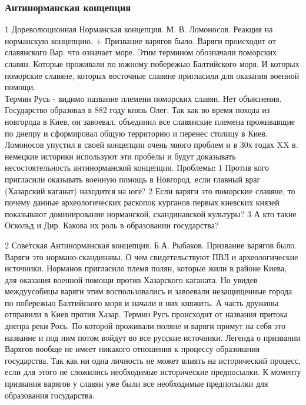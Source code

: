 \documentclass[a4paper]{article}
\begin{document}
\subsubsection{Антинорманская концепция}
1   Дореволюционная Норманская концепция. М. В. Ломоносов.
    Реакция на норманскую концепцию. 
    + Призвание варягов было. Варяги происходит от славянского Вар. что означает море. Этим термином обозначали поморских славян. Которые проживали по южному побережью Балтийского моря. И которых поморские славяне, которых восточные славяне пригласили для оказания военной помощи. \\
    Термин Русь - видимо название племени поморских славян. Нет объяснения. \\
    Государство образовал в 882 году князь Олег. Так как во время похода из новгорода в Киев, он завоевал, объединил все славянские племена проживавщие по днепру и сформировал общую территорию и перенес столицу в Киев.
    Ломоносов упустил в своей концепции очень много проблем и в 30х годах XX в. немецкие историки используют эти пробелы и будут доказывать несостоятельность антинорманской концепции.
    Проблемы: 
        1 Против кого пригласили оказывать военную помощь в Новгород, если главный враг (Хазарский каганат) находится на юге?
        2 Если варяги это поморские славяне, то почему данные археологических раскопок курганов первых киевских князей показывают доминирование норманской, скандинавской культуры?
        3 А кто такие Оскольд и Дир. Какова их роль в образовании государства?

2   Советская Антинорманская концепция. Б.А. Рыбаков.
    Призвание варягов было. Варяги это нормано-скандинавы. О чем свидетельствуют ПВЛ и археологические источники. Норманов пригласило племя полян, которые жили в районе Киева, для оказания военной помощи против Хазарского каганата. Но увидев междуусобицы варяги этим воспользовались и завоевали незащищенные города по побережью Балтийского моря и начали в них княжить. А часть дружины отправили в Киев против Хазар.
    Термин Русь происходит от названия притока днепра реки Рось.
    По которой проживали поляне и варяги примут на себя это название и под ним потом войдут во все русские источники. Легенда о призвании Варягов вообще не имеет никакого отношения к процессу образования государства. Так как ни одна личность не может влиять на исторический процесс, если для этого не сложились необходимые исторические предпосылки. К моменту призвания варягов у славян уже были все необходимые предпосылки для образования государства.
\end{document}
